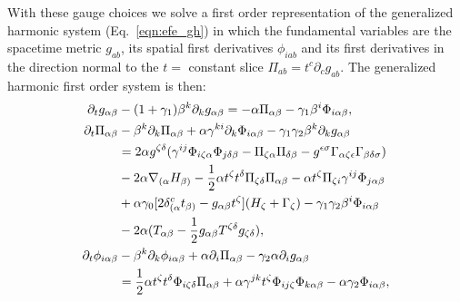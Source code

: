 With these gauge choices we solve a first order representation of the generalized harmonic system (Eq.~\ref{eqn:efe_gh}) in which the fundamental variables are the spacetime metric $ g_{ab}$, its spatial first derivatives $\phi_{iab}$ and its first derivatives in the direction normal to the $t=$ constant slice $\Pi_{ab} = t^c\partial_c g_{ab}$. The generalized harmonic first order system is then:
%
\begin{align}
  \partial_t g_{\alpha\beta} &- (1 + \gamma_1)\beta^k\partial_k g_{\alpha\beta} = -\alpha\Pi_{\alpha\beta} - \gamma_1\beta^i\Phi_{i\alpha\beta},  \\
  \partial_t\Pi_{\alpha\beta} &- \beta^k\partial_k\Pi_{\alpha\beta} + \alpha \gamma^{ki}\partial_k\Phi_{i\alpha\beta} - \gamma_1\gamma_2\beta^k\partial_k g_{\alpha\beta} \\
  &= 2\alpha g^{\zeta\delta}(\gamma^{ij}\Phi_{i\zeta\alpha}\Phi_{j\delta\beta} - \Pi_{\zeta\alpha}\Pi_{\delta\beta} -  g^{\epsilon\sigma}\Gamma_{\alpha\zeta\epsilon}\Gamma_{\beta\delta\sigma}) \notag\\
  &-2\alpha\nabla_{(\alpha}H_{\beta)} - \frac{1}{2}\alpha t^\zeta t^\delta\Pi_{\zeta\delta}\Pi_{\alpha\beta} - \alpha t^\zeta\Pi_{\zeta i}\gamma^{ij}\Phi_{j\alpha\beta} \notag\\
  &+\alpha\gamma_0[2\delta^c_{(\alpha}t_{\beta)} -  g_{\alpha\beta}t^\zeta](H_\zeta + \Gamma_\zeta) - \gamma_1\gamma_2\beta^i\Phi_{i\alpha\beta}\notag\\
    &-2\alpha(T_{\alpha\beta} - \frac{1}{2} g_{\alpha\beta}T^{\zeta\delta} g_{\zeta\delta}),\notag \\
  \partial_t\phi_{i\alpha\beta} &- \beta^k\partial_k\phi_{i\alpha\beta} + \alpha\partial_i\Pi_{\alpha\beta} - \gamma_2\alpha\partial_i g_{\alpha\beta} \\
  & = \frac{1}{2}\alpha t^\zeta t^\delta\Phi_{i\zeta\delta}\Pi_{\alpha\beta} + \alpha\gamma^{jk}t^\zeta\Phi_{ij\zeta}\Phi_{k\alpha\beta} - \alpha\gamma_2\Phi_{i\alpha\beta}\notag,
\end{align}
